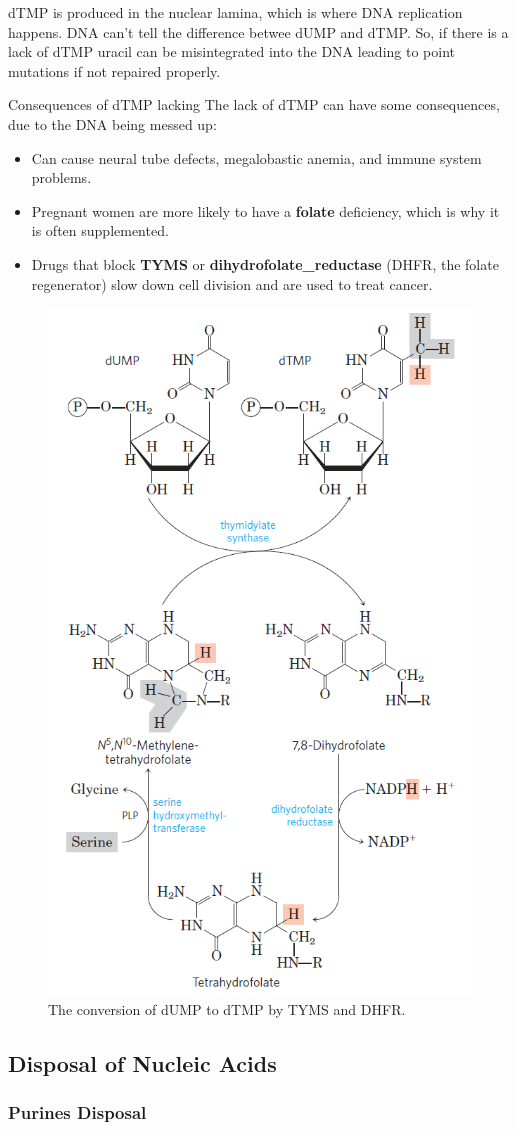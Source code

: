 \documentclass[../main.tex]{subfiles}
\begin{document}
dTMP is produced in the nuclear lamina, which is where DNA replication happens. DNA can't tell the difference betwee dUMP and dTMP. So, if there is a lack of dTMP uracil can be misintegrated into the DNA leading to point mutations if not repaired properly.

\begin{RemarkWithTitel}{Consequences of dTMP lacking} The lack of dTMP can have some consequences, due to the DNA being messed up: 
	\begin{itemize}
		\item Can cause neural tube defects, megalobastic anemia, and immune system problems.
		\item Pregnant women are more likely to have a \textbf{\gls{folate}} deficiency, which is why it is often supplemented.
		\item Drugs that block \textbf{TYMS} or \textbf{\gls{dihydrofolate_reductase}} (DHFR, the folate regenerator) slow down cell division and are used to treat cancer.
	\end{itemize} 
\end{RemarkWithTitel}
 
\begin{figure}[H]
	\centering
	\includegraphics[width=0.4\linewidth]{dTMP_path}
	\caption{The conversion of dUMP to dTMP by TYMS and DHFR.}
	\label{fig:dtmppath}
\end{figure}


\subsection{Disposal of Nucleic Acids}
\subsubsection{Purines Disposal}
\end{document}
